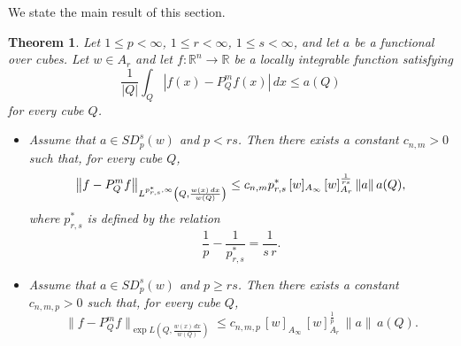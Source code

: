\documentclass[reqno, 10pt, oneside]{amsart}
\numberwithin{equation}{section}
\newcommand{\strt}[1]{\rule{0pt}{#1}}
\newtheorem{theorem}{Theorem}
\numberwithin{theorem}{section}
\newcommand{\R}{{\mathbb R}}
\newcommand{\norm}[1]{\left\|#1\right\|}
\newcommand{\1}{{\rm 1\hspace*{-0.4ex}%
\rule{0.1ex}{1.52ex}\hspace*{0.2ex}}}
\begin{document}
We state the main result of this section.


\begin{theorem}\label{Thm Pol 1}
	Let $1 \le p < \infty$, $1 \le r < \infty$, $1\le s<\infty$, and let $a$ be a functional over cubes. Let $w\in A_r$ and let $f:\R^n \longrightarrow \R$ be a locally integrable function satisfying
	\begin{equation*}
		\frac{1}{|Q|}\int_Q |f(x)-P_Q^mf(x)|\,dx \le a(Q)
	\end{equation*}
	for every cube $Q$.
	
	\begin{itemize}
		\item Assume that $a\in SD_p^s(w)$ and $p<rs$. Then there exists a constant $c_{n,m}>0$ such that, for every cube $Q$,
		\begin{equation}\label{eq:mainpoly}
			\norm{f-P_Q^mf}_{\strt{2.3ex} L^{p_{r,s}^{*},\infty}\left(Q, \frac{w(x)\,dx}{w(Q)}\right)}
			\le
			c_{n,m} p_{r,s}^{*}\,[w]_{A_\infty}\,[w]_{A_r}^{\frac{1}{rs}}\,
			\|a\|\,a(Q),
		\end{equation}
		where $p_{r,s}^{*}$ is defined by the relation
		\begin{equation*}
			\frac{1}{p}-\frac{1}{p_{r,s}^{*}}=\frac{1}{s \, r}.
		\end{equation*}
		
		\item Assume that $a\in SD_p^s(w)$ and $p\ge rs$. Then there exists a constant $c_{n,m,p}>0$ such that, for every cube $Q$,
		\begin{equation}\label{eq:exppoly}
			\|f-P_Q^mf\|_{\exp L\left(Q,\frac{w(x)\,dx}{w(Q)}\right)}
			\le
			c_{n,m,p}\,[w]_{A_\infty}\,[w]_{A_r}^{\frac1p}\,
			\|a\|\,a(Q).
		\end{equation}
	\end{itemize}
\end{theorem}
\end{document}
